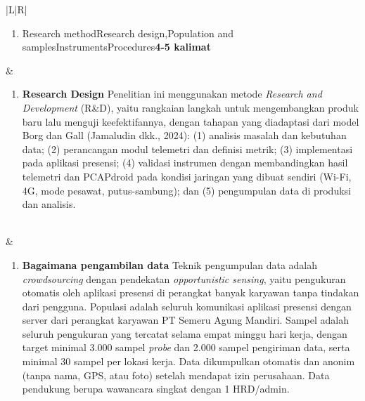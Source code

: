 \documentclass[11pt,a4paper]{article}
\begin{document}
\begin{longtable}{|L|R|}
\begin{enumerate}[label=\arabic*.,start=4]
\item Research method\newline Research design,\newline Population and samples\newline Instruments\newline Procedures\newline \textbf{4-5 kalimat}
\end{enumerate}
&
\begin{enumerate}[label=\arabic*.]
\item \textbf{Research Design}\newline
Penelitian ini menggunakan metode \textit{Research and Development} (R\&D), yaitu rangkaian langkah untuk mengembangkan produk baru lalu menguji keefektifannya, dengan tahapan yang diadaptasi dari model Borg dan Gall (Jamaludin dkk., 2024):\newline
(1) analisis masalah dan kebutuhan data;\newline
(2) perancangan modul telemetri dan definisi metrik;\newline
(3) implementasi pada aplikasi presensi;\newline
(4) validasi instrumen dengan membandingkan hasil telemetri dan PCAPdroid pada kondisi jaringan yang dibuat sendiri (Wi-Fi, 4G, mode pesawat, putus-sambung); dan\newline
(5) pengumpulan data di produksi dan analisis.
\end{enumerate}
\\
&
\begin{enumerate}[label=\arabic*.,start=2]
\item \textbf{Bagaimana pengambilan data}\newline
Teknik pengumpulan data adalah \textit{crowdsourcing} dengan pendekatan \textit{opportunistic sensing}, yaitu pengukuran otomatis oleh aplikasi presensi di perangkat banyak karyawan tanpa tindakan dari pengguna. Populasi adalah seluruh komunikasi aplikasi presensi dengan server dari perangkat karyawan PT Semeru Agung Mandiri. Sampel adalah seluruh pengukuran yang tercatat selama empat minggu hari kerja, dengan target minimal 3.000 sampel \textit{probe} dan 2.000 sampel pengiriman data, serta minimal 30 sampel per lokasi kerja. Data dikumpulkan otomatis dan anonim (tanpa nama, GPS, atau foto) setelah mendapat izin perusahaan. Data pendukung berupa wawancara singkat dengan 1 HRD/admin.

\end{enumerate}
\end{longtable}
\end{document}
